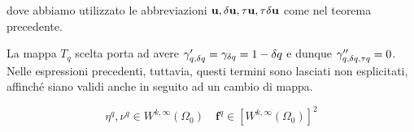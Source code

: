 dove abbiamo utilizzato le abbreviazioni $\mathbf{u},\mathbf{\delta u},\tau\mathbf{u}, \tau\mathbf{\delta u}$ come nel teorema precedente.
\begin{oss}
	La mappa $T_q$ scelta porta ad avere $\gamma'_{q,{\delta q}}=\gamma_{\delta q}=1-{\delta q}$ e dunque $\gamma''_{q,{\delta q},\tau q} = 0$. Nelle espressioni precedenti, tuttavia, questi termini sono lasciati non esplicitati, affinché siano validi anche in seguito ad un cambio di mappa.
\end{oss}

$$ \eta^q,\nu^q\in W^{k,\infty}(\Omega_0)\quad\mathbf f^q\in [W^{k,\infty}(\Omega_0)]^2 $$

